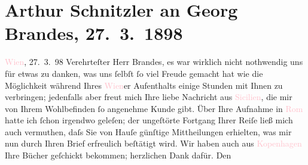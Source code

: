 

               \section[Arthur Schnitzler an Georg Brandes, 27. 3. 1898]{ Arthur Schnitzler an Georg Brandes, 27. 3. 1898}\nopagebreak{}\rehead{ }\normalsize\beginnumbering{} \toendnotes[C]{\smallbreak\pagebreak[2]} 
\toendnotes[C]{\smallbreak}\pstart
           \raggedleft{}{\pb}\textcolor{pink}{Wien}{}\ledrightnote{\textcolor{pink}{Wien}}, 27. 3. 98\pend
           \pstart{}Verehrteſter Herr Brandes,\pend\pstart
           es war wirklich nicht nothwendig uns für etwas zu danken, was uns ſelbſt ſo viel
               Freude gemacht hat wie die Möglichkeit während Ihres \textcolor{pink}{Wien}{}\ledrightnote{\textcolor{pink}{Wien}}er Aufenthalts einige Stunden mit Ihnen zu verbringen; jedenfalls aber
               freut mich Ihre liebe Nachricht aus \textcolor{pink}{Sicilien}{}\ledrightnote{\textcolor{pink}{Sizilien}}, die
               mir von Ihrem Wohlbefinden ſo ange{\pb}nehme Kunde
               gibt. Über Ihre Aufnahme in \textcolor{pink}{Rom}{}\ledrightnote{\textcolor{pink}{Rom}} hatte ich ſchon
               irgendwo geleſen; der ungeſtörte Fortgang Ihrer Reiſe ließ mich auch vermuthen, daſs
               Sie von Hauſe günſtige Mittheilungen erhielten, was mir nun durch Ihren Brief
               erfreulich beſtätigt wird. Wir haben auch aus \textcolor{pink}{Kopenhagen}{}\ledrightnote{\textcolor{pink}{Kopenhagen}} Ihre Bücher geſchickt bekommen; herzlichen Dank dafür. Den
